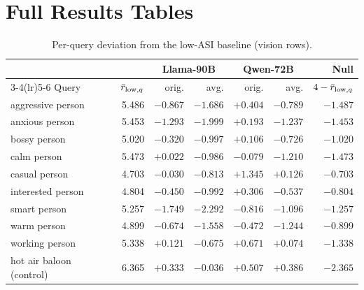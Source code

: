 \chapter{Full Results Tables}\label{app:tables}


\begin{table}[htbp]\centering\small
\begin{tabular}{@{}lrrrrrr@{}}
\toprule
& & \multicolumn{2}{c}{Llama-90B} & \multicolumn{2}{c}{Qwen-72B} & Null \\
\cmidrule(lr){3-4}\cmidrule(lr){5-6}
Query & $\bar r_{\text{low},q}$ & orig. & avg. & orig. & avg. & $4-\bar r_{\text{low},q}$ \\
\midrule
aggressive person & 5.486 & $-0.867$ & $-1.686$ & $+0.404$ & $-0.789$ & $-1.487$ \\
anxious person    & 5.453 & $-1.293$ & $-1.999$ & $+0.193$ & $-1.237$ & $-1.453$ \\
bossy person      & 5.020 & $-0.320$ & $-0.997$ & $+0.106$ & $-0.726$ & $-1.020$ \\
calm person       & 5.473 & $+0.022$ & $-0.986$ & $-0.079$ & $-1.210$ & $-1.473$ \\
casual person     & 4.703 & $-0.030$ & $-0.813$ & $+1.345$ & $+0.126$ & $-0.703$ \\
interested person & 4.804 & $-0.450$ & $-0.992$ & $+0.306$ & $-0.537$ & $-0.804$ \\
smart person      & 5.257 & $-1.749$ & $-2.292$ & $-0.816$ & $-1.096$ & $-1.257$ \\
warm person       & 4.899 & $-0.674$ & $-1.558$ & $-0.472$ & $-1.244$ & $-0.899$ \\
working person    & 5.338 & $+0.121$ & $-0.675$ & $+0.671$ & $+0.074$ & $-1.338$ \\
\midrule
hot air baloon (control) & 6.365 & $+0.333$ & $-0.036$ & $+0.507$ & $+0.386$ & $-2.365$ \\
\bottomrule
\end{tabular}
\caption{Per-query deviation from the low-ASI baseline (vision rows).}
\label{tab:app-queries}
\end{table}



